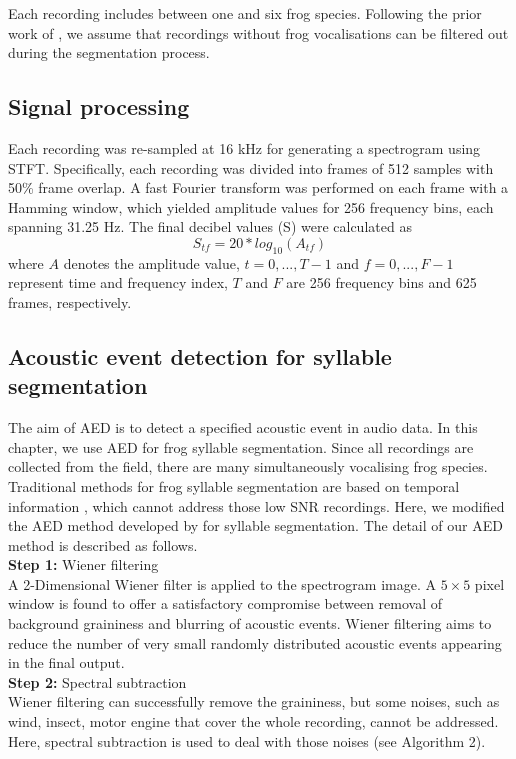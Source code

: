 Each recording includes between one and six frog species. Following the prior work of \citep{briggs2012acoustic}, we assume that recordings without frog vocalisations can be filtered out during the segmentation process.

\subsection{Signal processing}
Each recording was re-sampled at 16 kHz for generating a spectrogram using STFT. Specifically, each recording was divided into frames of 512 samples with 50\% frame overlap.
A fast Fourier transform was performed on each frame with a Hamming window, which yielded amplitude values for 256 frequency bins, each spanning 31.25 Hz. The final decibel values (S) were calculated as 
\begin{equation}
S_{tf} = 20*log_{10}(A_{tf})
\end{equation}
where $A$ denotes the amplitude value, $t=0,...,T-1$ and $f=0,...,F-1$ represent time and frequency index, $T$ and $F$ are 256 frequency bins and 625 frames, respectively. 

\subsection{Acoustic event detection for syllable segmentation}
\label{Ch5:AEDmethod}

The aim of AED is to detect a specified acoustic event in audio data. In this chapter, we use AED for frog syllable segmentation. Since all recordings are collected from the field, there are many simultaneously vocalising frog species. Traditional methods for frog syllable segmentation are based on temporal information \citep{somervuo2004classification,huang2009frog}, which cannot address those low SNR recordings. Here, we modified the AED method developed by  \cite{towsey2012toolbox} for syllable segmentation. The detail of our AED method is described as follows.
\\
\textbf{Step 1:} Wiener filtering 
\noindent
\\
A 2-Dimensional Wiener filter is applied to the spectrogram image. A $5\times5$ pixel window is found to offer a satisfactory compromise between removal of background graininess and blurring of acoustic events. Wiener filtering aims to reduce the number of very small randomly distributed acoustic events appearing in the final output.
\\
\textbf{Step 2:} Spectral subtraction
\noindent 
\\
Wiener filtering can successfully remove the graininess, but some noises, such as wind, insect, motor engine that cover the whole recording, cannot be addressed. Here, spectral subtraction is used to deal with those noises (see Algorithm 2). 


